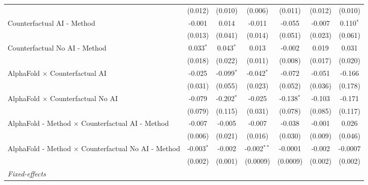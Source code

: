 \begin{tabular}{lcccccc}
                                                              & (0.012)       & (0.010)       & (0.006)       & (0.011)       & (0.012)       & (0.010)\\   
   Counterfactual AI - Method                                 & -0.001        & 0.014         & -0.011        & -0.055        & -0.007        & 0.110$^{*}$\\   
                                                              & (0.013)       & (0.041)       & (0.014)       & (0.051)       & (0.023)       & (0.061)\\   
   Counterfactual No AI - Method                              & 0.033$^{*}$   & 0.043$^{*}$   & 0.013         & -0.002        & 0.019         & 0.031\\   
                                                              & (0.018)       & (0.022)       & (0.011)       & (0.008)       & (0.017)       & (0.020)\\   
   AlphaFold $\times$ Counterfactual AI                       & -0.025        & -0.099$^{*}$  & -0.042$^{*}$  & -0.072        & -0.051        & -0.166\\   
                                                              & (0.031)       & (0.055)       & (0.023)       & (0.052)       & (0.036)       & (0.178)\\   
   AlphaFold $\times$ Counterfactual No AI                    & -0.079        & -0.202$^{*}$  & -0.025        & -0.138$^{*}$  & -0.103        & -0.171\\   
                                                              & (0.079)       & (0.115)       & (0.031)       & (0.078)       & (0.085)       & (0.117)\\   
   AlphaFold - Method $\times$ Counterfactual AI - Method     & -0.007        & -0.005        & -0.007        & -0.038        & -0.001        & 0.026\\   
                                                              & (0.006)       & (0.021)       & (0.016)       & (0.030)       & (0.009)       & (0.046)\\   
   AlphaFold - Method $\times$ Counterfactual No AI - Method  & -0.003$^{*}$  & -0.002        & -0.002$^{**}$ & -0.0001       & -0.002        & -0.0007\\   
                                                              & (0.002)       & (0.001)       & (0.0009)      & (0.0009)      & (0.002)       & (0.002)\\   
   \midrule
   \emph{Fixed-effects}\\

\end{tabular}
